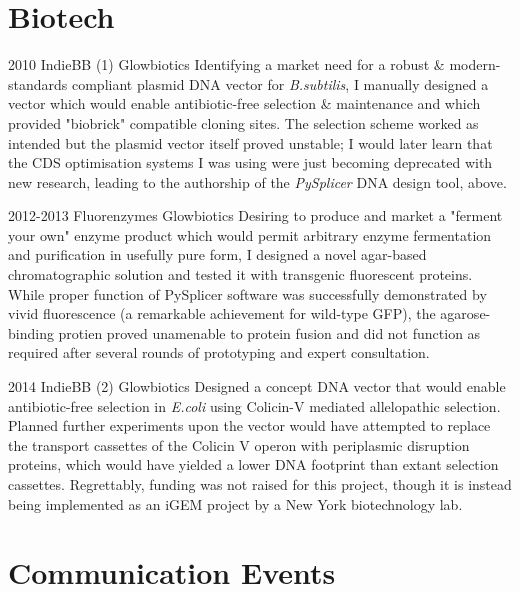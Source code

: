 \documentclass[]{friggeri-cv} %
\begin{document}
\section{Biotech}
\begin{entrylist}
\entry
{2010}
{IndieBB (1)}
{Glowbiotics}
{Identifying a market need for a robust \& modern-standards compliant plasmid DNA vector
for \emph{B.subtilis}, I manually designed a vector which would enable antibiotic-free
selection \& maintenance and which provided "biobrick" compatible cloning sites.
The selection scheme worked as intended but the plasmid vector itself proved unstable;
I would later learn that the CDS optimisation systems I was using were just becoming
deprecated with new research, leading to the authorship of the \emph{PySplicer} DNA design
tool, above.
}

\entry
{2012-2013}
{Fluorenzymes}
{Glowbiotics}
{Desiring to produce and market a "ferment your own" enzyme product which would permit
arbitrary enzyme fermentation and purification in usefully pure form, I designed a novel
agar-based chromatographic solution and tested it with transgenic fluorescent proteins.
While proper function of PySplicer software was successfully demonstrated by vivid
fluorescence (a remarkable achievement for wild-type GFP), the agarose-binding protien
proved unamenable to protein fusion and did not function as required after several rounds
of prototyping and expert consultation.
}

\entry
{2014}
{IndieBB (2)}
{Glowbiotics}
{Designed a concept DNA vector that would enable antibiotic-free selection in \emph{E.coli}
using Colicin-V mediated allelopathic selection. Planned further experiments upon the
vector would have attempted to replace the transport cassettes of the Colicin V
operon with periplasmic disruption proteins, which would have yielded a lower DNA
footprint than extant selection cassettes.
Regrettably, funding was not raised for this project, though it is instead being implemented
as an iGEM project by a New York biotechnology lab.
}

\end{entrylist}


\section{Communication Events}
\end{document}
